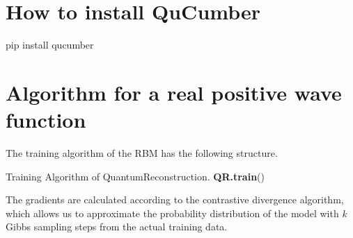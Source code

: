 \documentclass[submission, Phys]{SciPost}
\begin{document}
\begin{appendix}

	\section{How to install QuCumber}

	\begin{python}
		pip install qucumber
	\end{python}

	\section{Algorithm for a real positive wave function}
	The training algorithm of the RBM has the following structure.

	\begin{algorithm}[H]
		\caption{Training Algorithm of QuantumReconstruction. \textbf{QR.train}() }
		\SetAlgoLined

	\end{algorithm}


	The gradients are calculated according to the contrastive divergence algorithm, which allows us to approximate the probability distribution of the model with $k$ Gibbs sampling steps from the actual training data.

	\begin{algorithm}[H]
		\caption{Compute Gradient from Batch. \textbf{\lstinline{QR.compute_batch_gradients}}(k, batch, basis) }
		\SetAlgoLined
	\end{algorithm}


\end{appendix}
\end{document}
